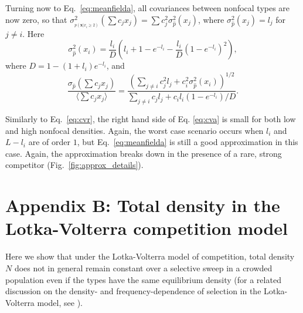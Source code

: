 \documentclass[12pt]{article}
\begin{document}
Turning now to Eq.~\eqref{eq:meanfielda}, all covariances between nonfocal types are now zero, so that $\sigma_{_{p({\mathbf x}|x_i\geq 2)}}^2(\sum c_j x_j)=\sum c_j^2 \sigma_{\hat{p}}^2(x_j)$, where $\sigma_{\hat{p}}^2(x_j)=l_j$ for $j\neq i$. Here  
\begin{equation}
\sigma_{\hat{p}}^2(x_i)=\frac{l_i}{D}\left(l_i+1-e^{-l_i}-\frac{l_i}{D}\left(1-e^{-l_i}\right)^2\right),
\end{equation}
where $D= 1-(1+l_i)e^{-l_i}$, and 
\begin{equation}
\frac{\sigma_{\hat{p}}(\sum c_j x_j)}{\langle\sum c_j x_j\rangle} = \frac{\left(\sum_{j\neq i} c_j^2 l_j + c_i^2 \sigma_{\hat{p}}^2(x_i)\right)^{1/2}}{\sum_{j\neq i} c_j l_j + c_i l_i (1-e^{-l_i})/D} \label{eq:cva}.
\end{equation}

Similarly to Eq.~\eqref{eq:cvr}, the right hand side of Eq. \eqref{eq:cva} is small for both low and high nonfocal densities. Again, the worst case scenario occurs when $l_i$ and $L-l_i$ are of order $1$, but Eq.~\eqref{eq:meanfielda} is still a good approximation in this case. Again, the approximation breaks down in the presence of a rare, strong competitor (Fig.~\ref{fig:approx_details}).

\section*{Appendix B: Total density in the Lotka-Volterra competition model}

Here we show that under the Lotka-Volterra model of competition, total density $N$ does not in general remain constant over a selective sweep in a crowded population even if the types have the same equilibrium density (for a related discussion on the density- and frequency-dependence of selection in the Lotka-Volterra model, see \citep{smouse_1976,mallet_2012}).
\end{document}
